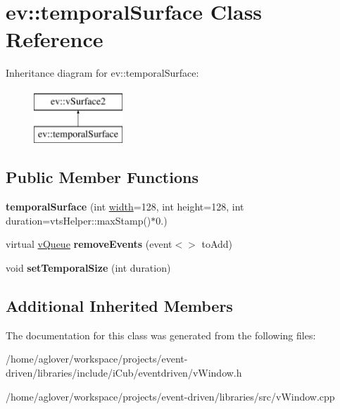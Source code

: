 \hypertarget{classev_1_1temporalSurface}{}\section{ev\+:\+:temporal\+Surface Class Reference}
\label{classev_1_1temporalSurface}
Inheritance diagram for ev\+:\+:temporal\+Surface\+:\begin{figure}[H]
\begin{center}
\leavevmode
\includegraphics[height=2.000000cm]{classev_1_1temporalSurface}
\end{center}
\end{figure}
\subsection*{Public Member Functions}
\begin{DoxyCompactItemize}
\item 
{\bfseries temporal\+Surface} (int \hyperlink{classev_1_1vSurface2_a1aa8027816352a15d5b9bf1f26f48e76}{width}=128, int height=128, int duration=vts\+Helper\+::max\+Stamp()$\ast$0.)\hypertarget{classev_1_1temporalSurface_ad2f8ebcbe5ff5825d0473cd05f00389e}{}\label{classev_1_1temporalSurface_ad2f8ebcbe5ff5825d0473cd05f00389e}

\item 
virtual \hyperlink{classev_1_1vQueue}{v\+Queue} {\bfseries remove\+Events} (event$<$$>$ to\+Add)\hypertarget{classev_1_1temporalSurface_a358c548e6727aa89d908e61ad948b1ca}{}\label{classev_1_1temporalSurface_a358c548e6727aa89d908e61ad948b1ca}

\item 
void {\bfseries set\+Temporal\+Size} (int duration)\hypertarget{classev_1_1temporalSurface_a35d4b67c18393961fa833d330a040e80}{}\label{classev_1_1temporalSurface_a35d4b67c18393961fa833d330a040e80}

\end{DoxyCompactItemize}
\subsection*{Additional Inherited Members}


The documentation for this class was generated from the following files\+:\begin{DoxyCompactItemize}
\item 
/home/aglover/workspace/projects/event-\/driven/libraries/include/i\+Cub/eventdriven/v\+Window.\+h\item 
/home/aglover/workspace/projects/event-\/driven/libraries/src/v\+Window.\+cpp\end{DoxyCompactItemize}
